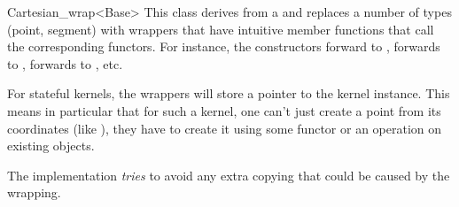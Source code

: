 \begin{ccRefClass}{Cartesian_wrap<Base>}
\ccDefinition
This class derives from a   and replaces a number
of types (point, segment) with wrappers that have intuitive member
functions that call the corresponding functors. For instance, the
constructors forward to ,
 forwards to
,
 forwards to
, etc.

For stateful kernels, the wrappers will store a pointer to the kernel
instance. This means in particular that for such a kernel, one can't
just create a point from its coordinates (like ),
they have to create it using some functor or an operation on existing
objects.

\ccIsModel
{}

\ccImplementation
The implementation \emph{tries} to avoid any extra copying that could be
caused by the wrapping.

\end{ccRefClass}
